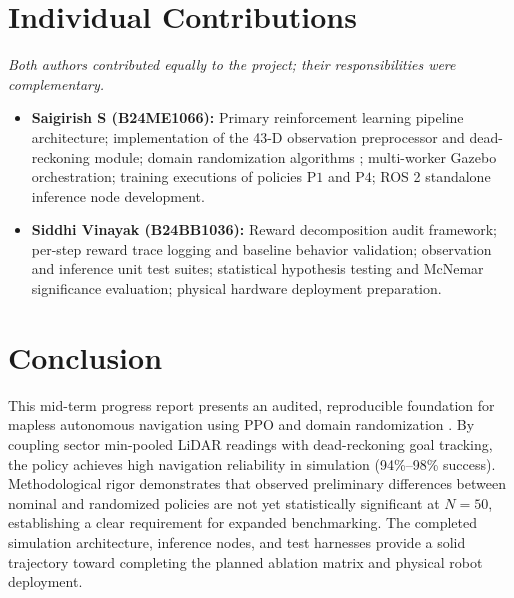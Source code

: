 \documentclass[conference]{IEEEtran}
\begin{document}
\section{Individual Contributions}
\textit{Both authors contributed equally to the project; their responsibilities were complementary.}

\begin{itemize}
    \item \textbf{Saigirish S (B24ME1066):} Primary reinforcement learning pipeline architecture; implementation of the 43-D observation preprocessor and dead-reckoning module; domain randomization algorithms \cite{tobin2017domain, peng2018sim}; multi-worker Gazebo orchestration; training executions of policies $\text{P1}$ and $\text{P4}$; ROS 2 standalone inference node development.
    \item \textbf{Siddhi Vinayak (B24BB1036):} Reward decomposition audit framework; per-step reward trace logging and baseline behavior validation; observation and inference unit test suites; statistical hypothesis testing and McNemar significance evaluation; physical hardware deployment preparation.
\end{itemize}

\section{Conclusion}
This mid-term progress report presents an audited, reproducible foundation for mapless autonomous navigation using PPO \cite{schulman2017proximal} and domain randomization \cite{tobin2017domain, peng2018sim}. By coupling sector min-pooled LiDAR readings with dead-reckoning goal tracking, the policy achieves high navigation reliability in simulation (94\%--98\% success). Methodological rigor demonstrates that observed preliminary differences between nominal and randomized policies are not yet statistically significant at $N=50$, establishing a clear requirement for expanded benchmarking. The completed simulation architecture, inference nodes, and test harnesses provide a solid trajectory toward completing the planned ablation matrix and physical robot deployment.



\end{document}
